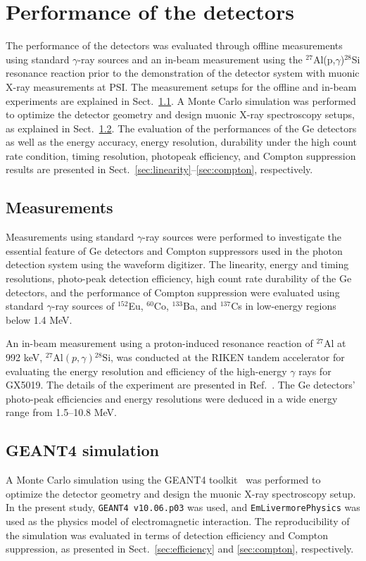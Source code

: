 \section{Performance of the detectors}
\label{sec:Performance}
The performance of the detectors was evaluated through offline measurements using standard $\gamma$-ray sources and an in-beam measurement using the $^{27}$Al(p,$\gamma$)$^{28}$Si resonance reaction prior to the demonstration of the detector system with muonic X-ray measurements at PSI.
The measurement setups for the offline and in-beam experiments are explained in Sect.~\ref{sec:Methods_2}.
A Monte Carlo simulation was performed to optimize the detector geometry and design muonic X-ray spectroscopy setups, as explained in Sect.~\ref{sec:Methods_3}. 
The evaluation of the performances of the Ge detectors as well as the energy accuracy, energy resolution, durability under the high count rate condition, timing resolution, photopeak efficiency, and Compton suppression results are presented in Sect.~\ref{sec:linearity}--\ref{sec:compton}, respectively. 


\subsection{Measurements} \label{sec:Methods_2}
Measurements using standard $\gamma$-ray sources were performed 
to investigate the essential feature of Ge detectors and Compton suppressors used in the photon detection system using the waveform digitizer. 
The linearity, energy and timing resolutions, photo-peak detection efficiency, high count rate durability of the Ge detectors, and the performance of Compton suppression were evaluated using standard $\gamma$-ray sources of 
$^{152}$Eu, $^{60}$Co, $^{133}$Ba, and $^{137}$Cs in low-energy regions below 1.4 MeV. 


An in-beam measurement using a proton-induced resonance reaction of $^{27}$Al at 992 keV, $^{27}\mathrm{Al}(p,\gamma){}^{28}\mathrm{Si}$, was conducted at the RIKEN tandem accelerator for evaluating the energy resolution and efficiency of the high-energy $\gamma$ rays for GX5019. 
The details of the experiment are presented in Ref.~\cite{Mizuno2023-px}.
The Ge detectors' photo-peak efficiencies and energy resolutions were deduced in a wide energy range from 1.5--10.8 MeV. 


\subsection{GEANT4 simulation}\label{sec:Methods_3}
A Monte Carlo simulation using the GEANT4 toolkit~\cite{Agostinelli2003-eh} was performed to optimize the detector geometry and design the muonic X-ray spectroscopy setup.
In the present study, \texttt{GEANT4 v10.06.p03} was used, and \texttt{EmLivermorePhysics} was used as the physics model of electromagnetic interaction.
The reproducibility of the simulation was evaluated in terms of detection efficiency and Compton suppression, as presented in Sect.~\ref{sec:efficiency} and \ref{sec:compton}, respectively.

